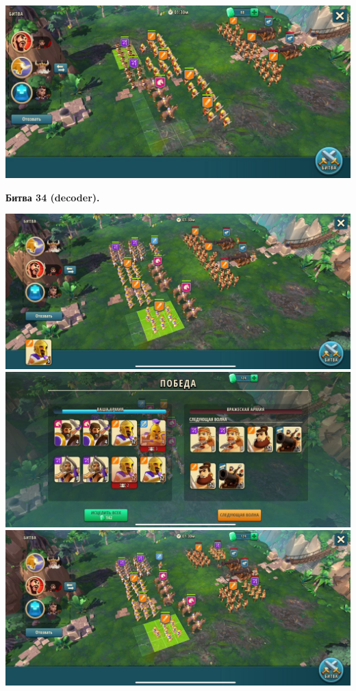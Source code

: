 \noindent\includegraphics[width=\linewidth]{./parts/media/TreasureHunt/33/sargon/photo_2022-04-07_10-06-37.jpg} \newline

\newpage
\begin{center}
	\hypertarget{fight34}{\textbf{Битва 34 (decoder).}}
\end{center}
\noindent\includegraphics[width=\linewidth]{./parts/media/TreasureHunt/34/decoder/photo_2022-04-07_10-02-34.jpg} \newline
\noindent\includegraphics[width=\linewidth]{./parts/media/TreasureHunt/34/decoder/photo_2022-04-07_10-02-43.jpg} \newline
\noindent\includegraphics[width=\linewidth]{./parts/media/TreasureHunt/34/decoder/photo_2022-04-07_10-02-46.jpg} \newline
